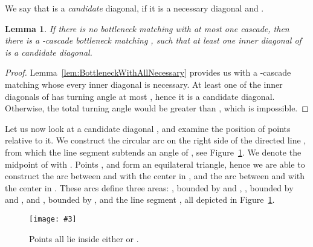 \documentclass[a4paper, 11pt]{article}
\newtheorem{lemma}[theorem]{Lemma}
\newcommand{\fig}[3]{
	\begin{figure}[ht]
		\centering
		\texttt{[image: \#3]}
		\caption{#2}
		\label{#1}
	\end{figure}
}
\begin{document}
We say that  is a \emph{candidate} diagonal, if it is a necessary diagonal and .

\begin{lemma}
	\label{lem:BottleneckWithCandidate}
	If there is no bottleneck matching with at most one cascade, then there is a -cascade bottleneck matching , such that at least one inner diagonal of  is a candidate diagonal.
\end{lemma}
\begin{proof}
	Lemma~\ref{lem:BottleneckWithAllNecessary} provides us with a -cascade matching  whose every inner diagonal is necessary. At least one of the  inner diagonals of  has turning angle at most , hence it is a candidate diagonal. Otherwise, the total turning angle would be greater than , which is impossible.
\end{proof}
	
	
Let us now look at a candidate diagonal , and examine the position of points  relative to it. We construct the circular arc  on the right side of the directed line , from which the line segment  subtends an angle of , see Figure~\ref{fig:Polarity}. We denote the midpoint of  with . Points ,  and  form an equilateral triangle, hence we are able to construct the arc  between  and  with the center in , and the arc  between  and  with the center in . These arcs define three areas: , bounded by  and , , bounded by  and , and , bounded by ,  and the line segment , all depicted in Figure~\ref{fig:Polarity}.

\fig{fig:Polarity}{Points  all lie inside either  or .}{Polarity.pdf}
\end{document}
